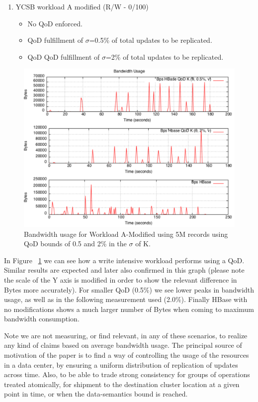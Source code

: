 \begin{enumerate}
\item{YCSB workload A modified (R/W - 0/100)}
	\begin{itemize}
		\item No QoD enforced.
		\item QoD fulfillment of $\sigma$=0.5\% of total updates to be replicated.	%
		\item QoD QoD fulfillment of $\sigma$=2\% of total updates to be replicated.  %
	\end{itemize}
\end{enumerate}

\begin{figure}
\centering
\includegraphics[width=0.8\linewidth]{figs/plot-packets-size-workloada-modified-allbounds-30threads.pdf}
\caption{Bandwidth usage for Workload A-Modified using 5M records using QoD bounds of 0.5 and 2\% in the $\sigma$ of K.}
\label{fig-bandwidth-worloada-modified}
\end{figure}

In Figure ~\ref{fig-bandwidth-worloada-modified} we can see how a write intensive workload performs using a QoD. Similar results are expected and later also confirmed in this graph (please note the scale of the Y axis is modified in order to show the relevant difference in Bytes more accurately).
  For smaller QoD (0.5\%) we see lower peaks in bandwidth usage, as well as in the following measurement used (2.0\%). Finally HBase with no modifications shows a much larger number of Bytes when coming to maximum bandwidth consumption.
 
 Note we are not measuring, or find relevant, in any of these scenarios, to realize any kind of claims based on average bandwidth usage. The principal source of motivation of the paper is to find a way of controlling the usage of the resources in a data center, by ensuring a uniform distribution of replication of updates across time. Also, to be able to trade strong consistency for groups of operations treated atomically, for shipment to the destination cluster location at a given point in time, or when the data-semantics bound is reached. 


